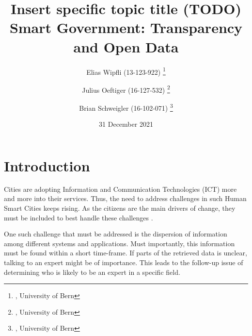 \documentclass[a4paper,12pt]{article}
\begin{document}

\title{
   Insert specific topic title (TODO) \\ 
   \large Smart Government: Transparency and Open Data} %


\author{
   Elias Wipfli (13-123-922) 
   \thanks{, University of Bern}
   \and
   Julius Oeftiger (16-127-532) 
   \thanks{, University of Bern}
   \and
   Brian Schweigler (16-102-071)
   \thanks{, University of Bern}
}



\date{31 December 2021} %

\maketitle

\begin{abstract}



\end{abstract}

\tableofcontents
\newpage

\section{Introduction}
Cities are adopting Information and Communication Technologies (ICT) more and more into their services.
Thus, the need to address challenges in such Human Smart Cities keeps rising.
As the citizens are the main drivers of change, they must be included to best handle these challenges \cite{oliveira_smart_2015}.

One such challenge that must be addressed is the dispersion of information among different systems and applications.
Must importantly, this information must be found within a short time-frame.
If parts of the retrieved data is unclear, talking to an expert might be of importance.
This leads to the follow-up issue of determining who is likely to be an expert in a specific field.
\end{document}
